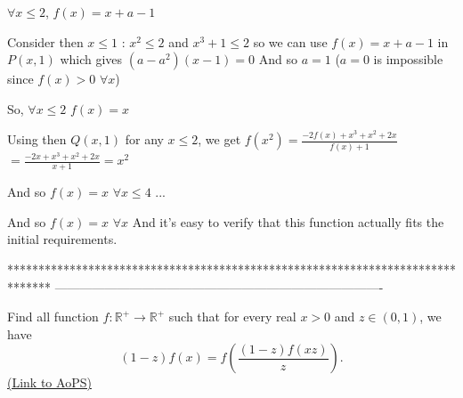 \begin{solution}
$ \forall x\leq 2$, $ f(x)=x+a-1$

Consider then $ x\leq 1$ : $ x^2\leq 2$ and $ x^3+1\leq 2$ so we can use $ f(x)=x+a-1$ in $ P(x,1)$ which gives $ (a-a^2)(x-1)=0$
And so $ a=1$ ($ a=0$ is impossible since $ f(x)>0$ $ \forall x$)

So, $ \forall x\leq 2$ $ f(x)=x$

Using then $ Q(x,1)$ for any $ x\leq 2$, we get $ f(x^2)=\frac{-2f(x)+x^3+x^2+2x}{f(x)+1}$ $ =\frac{-2x+x^3+x^2+2x}{x+1}=x^2$

And so $ f(x)=x$ $ \forall x\leq 4$ ...

And so $ f(x)=x$ $ \forall x$
And it's easy to verify that this function actually fits the initial requirements.
\end{solution}
*******************************************************************************
-------------------------------------------------------------------------------

\begin{problem}
	Find all function $f: \mathbb R^{+} \to \mathbb R^{+}$ such that for every real  $ x>0$ and $ z \in (0,1)$, we have \[(1- z)  f(x)= f\left( \frac{(1- z)f(xz)}{z}\right).\]
	\flushright \href{https://artofproblemsolving.com/community/c6h183666}{(Link to AoPS)}
\end{problem}



